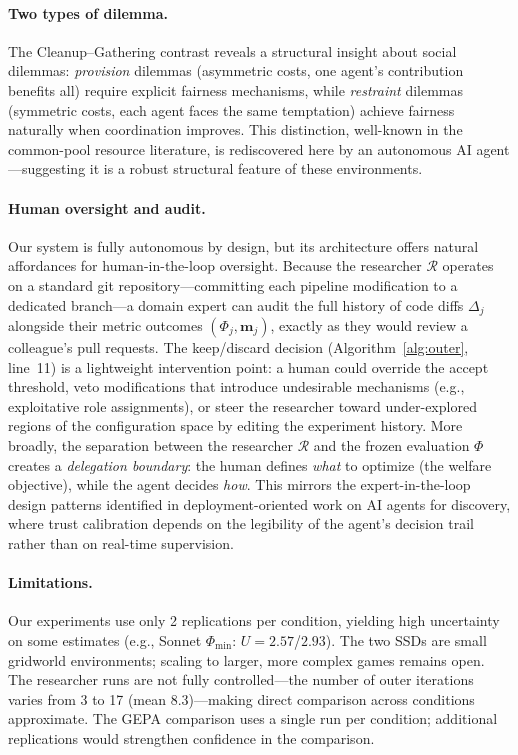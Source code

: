 \documentclass[sigconf,authordraft]{acmart}
\newcommand{\cR}{\mathcal{R}}
\newcommand{\bm}{\mathbf{m}}
\begin{document}
\paragraph{Two types of dilemma.}
The Cleanup--Gathering contrast reveals a structural insight about social dilemmas: \emph{provision} dilemmas (asymmetric costs, one agent's contribution benefits all) require explicit fairness mechanisms, while \emph{restraint} dilemmas (symmetric costs, each agent faces the same temptation) achieve fairness naturally when coordination improves. This distinction, well-known in the common-pool resource literature, is rediscovered here by an autonomous AI agent---suggesting it is a robust structural feature of these environments.

\paragraph{Human oversight and audit.}
Our system is fully autonomous by design, but its architecture offers natural affordances for human-in-the-loop oversight. Because the researcher $\cR$ operates on a standard git repository---committing each pipeline modification to a dedicated branch---a domain expert can audit the full history of code diffs $\Delta_j$ alongside their metric outcomes $(\Phi_j, \bm_j)$, exactly as they would review a colleague's pull requests. The keep/discard decision (Algorithm~\ref{alg:outer}, line~11) is a lightweight intervention point: a human could override the accept threshold, veto modifications that introduce undesirable mechanisms (e.g., exploitative role assignments), or steer the researcher toward under-explored regions of the configuration space by editing the experiment history. More broadly, the separation between the researcher $\cR$ and the frozen evaluation $\Phi$ creates a \emph{delegation boundary}: the human defines \emph{what} to optimize (the welfare objective), while the agent decides \emph{how}. This mirrors the expert-in-the-loop design patterns identified in deployment-oriented work on AI agents for discovery, where trust calibration depends on the legibility of the agent's decision trail rather than on real-time supervision.

\paragraph{Limitations.}
Our experiments use only 2 replications per condition, yielding high uncertainty on some estimates (e.g., Sonnet $\Phi_{\min}$: $U{=}2.57$/$2.93$). The two SSDs are small gridworld environments; scaling to larger, more complex games remains open. The researcher runs are not fully controlled---the number of outer iterations varies from 3 to 17 (mean 8.3)---making direct comparison across conditions approximate. The GEPA comparison uses a single run per condition; additional replications would strengthen confidence in the comparison.
\end{document}
